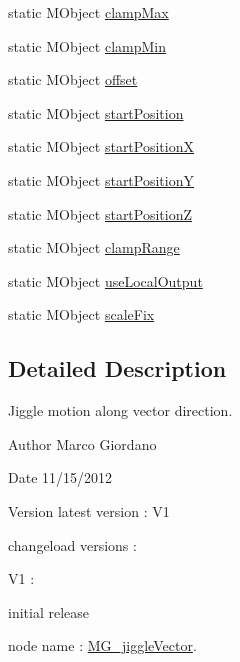 \begin{DoxyCompactItemize}
\item 
static M\-Object \hyperlink{class_m_g__jiggle_vector_a8f397a47c080b1930f2637673ddd50b8}{clamp\-Max}
\item 
static M\-Object \hyperlink{class_m_g__jiggle_vector_a5f37c464cdbc951b5f71e1da2407facc}{clamp\-Min}
\item 
static M\-Object \hyperlink{class_m_g__jiggle_vector_aace586c7205919a5f2cfd3004e398fe1}{offset}
\item 
static M\-Object \hyperlink{class_m_g__jiggle_vector_a6731eddb749c12928566d0bcddb81983}{start\-Position}
\item 
static M\-Object \hyperlink{class_m_g__jiggle_vector_a14684897a82ddbe91f4a111ec0b0fbf5}{start\-Position\-X}
\item 
static M\-Object \hyperlink{class_m_g__jiggle_vector_a322050f97129dd0040871b3d9921e360}{start\-Position\-Y}
\item 
static M\-Object \hyperlink{class_m_g__jiggle_vector_a8934def35cd8c24f2af9c0f0edc03858}{start\-Position\-Z}
\item 
static M\-Object \hyperlink{class_m_g__jiggle_vector_a6fb6f77999b85dd0ed5ed38340215eb2}{clamp\-Range}
\item 
static M\-Object \hyperlink{class_m_g__jiggle_vector_ad81b7cebe25d1b1f6c4ef1d234233015}{use\-Local\-Output}
\item 
static M\-Object \hyperlink{class_m_g__jiggle_vector_aaf10913674da4674212e007b6175d140}{scale\-Fix}
\end{DoxyCompactItemize}


\subsection{Detailed Description}
Jiggle motion along vector direction. 

\begin{DoxyAuthor}{Author}
Marco Giordano 
\end{DoxyAuthor}
\begin{DoxyDate}{Date}
11/15/2012 
\end{DoxyDate}
\begin{DoxyVersion}{Version}
latest version \-: V1 

changeload versions \-: \par
 V1 \-: \par

\begin{DoxyItemize}
\item initial release \par

\end{DoxyItemize}
\end{DoxyVersion}
node name \-: \hyperlink{class_m_g__jiggle_vector}{M\-G\-\_\-jiggle\-Vector}.

